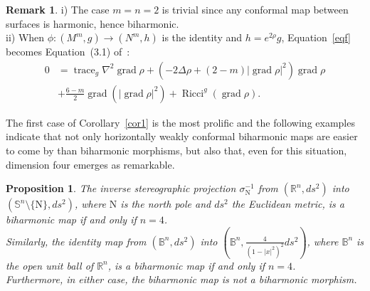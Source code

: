 \documentclass[12pt]{amsart}
\theoremstyle{plain}
\newtheorem{prop}{Proposition}
\theoremstyle{definition}
\newtheorem{rk}{Remark}
\begin{document}
\begin{rk} i) The case $m=n=2$ is trivial since any conformal map between surfaces is harmonic, hence biharmonic.\\
ii) When $\phi: (M^m ,g) \to (N^m ,h)$ is the identity and $h= e^{2\rho} g$,
Equation~\eqref{eqf} becomes Equation~(3.1) of~\cite{Bal}:
\begin{align*}
0 &= \operatorname{trace}_{g} \nabla^2 \operatorname{grad}\rho + (-2\Delta \rho + (2-m)|\operatorname{grad}\rho|^2) \operatorname{grad}\rho \\
&+ \tfrac{6-m}{2} \operatorname{grad} (|\operatorname{grad}\rho|^2 ) + \operatorname{Ricci}^{g}(\operatorname{grad}\rho) .
\end{align*}
\end{rk}

The first case of Corollary~\ref{cor1} is the most prolific and the following
examples indicate that not only horizontally weakly conformal biharmonic maps are
easier to come by than biharmonic morphisms, but also that, even for this situation,
dimension four emerges as remarkable.

\begin{prop}
The inverse stereographic projection $\sigma_{\mathrm N}^{-1}$ from $({{\mathbb R}}^n ,ds^2)$
into $({{\mathbb S}}^{n}\setminus\{\mathrm N\} , ds^2)$, where $\mathrm N$ is the north pole and 
$ds^2$ the Euclidean metric, is a biharmonic map if and only if $n=4$.\\
Similarly, the identity map from  $({{\mathbb B}}^{n}, ds^2)$
into $({{\mathbb B}}^{n},\tfrac{4}{(1 - |x|^2)^2} ds^2)$, where ${{\mathbb B}}^n$ is the open unit ball of ${{\mathbb R}}^n$,
 is a biharmonic map if and only if $n=4$.\\
Furthermore, in either case, the biharmonic map is not a biharmonic morphism.
\end{prop}
\end{document}
